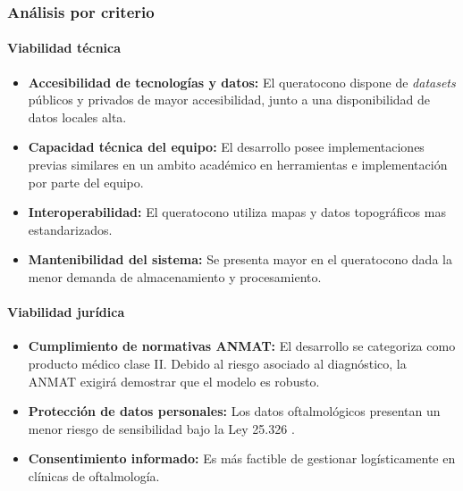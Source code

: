             \subsubsection*{Análisis por criterio}
        
            \paragraph{Viabilidad técnica}
        
            \begin{itemize}
                \item \textbf{Accesibilidad de tecnologías y datos:} El queratocono dispone de \textit{datasets} públicos y privados de mayor accesibilidad, junto a una disponibilidad de datos locales alta.
        
                \item \textbf{Capacidad técnica del equipo:} El desarrollo posee implementaciones previas similares en un ambito académico en herramientas e implementación por parte del equipo.
        
                \item \textbf{Interoperabilidad:} El queratocono utiliza mapas y datos topográficos mas estandarizados.
        
                \item \textbf{Mantenibilidad del sistema:} Se presenta mayor en el queratocono dada la menor demanda de almacenamiento y procesamiento.
            \end{itemize}
        
            \paragraph{Viabilidad jurídica} 
        
            \begin{itemize}
                \item \textbf{Cumplimiento de normativas ANMAT:} El desarrollo se categoriza como producto médico clase II. Debido al riesgo asociado al diagnóstico, la ANMAT exigirá demostrar que el modelo es robusto.
                
                \item \textbf{Protección de datos personales:} Los datos oftalmológicos presentan un menor riesgo de sensibilidad bajo la Ley 25.326 .
                
                \item \textbf{Consentimiento informado:} Es más factible de gestionar logísticamente en clínicas de oftalmología.
            \end{itemize}
        
